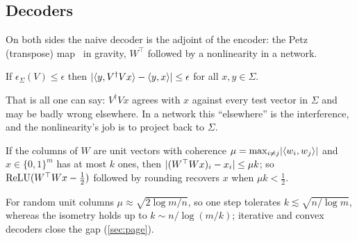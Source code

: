 \subsection{Decoders}
On both sides the naive decoder is the adjoint of the encoder: the Petz (transpose) map~\cite{Petz} in gravity,
$W^\top$ followed by a nonlinearity in a network.
\begin{lemma}\proved
If $\epsilon_\Sigma(V)\le\epsilon$ then $\lvert \langle y,V^\dagger Vx\rangle-\langle y,x\rangle\rvert\le\epsilon$ for all $x,y\in\Sigma$.
\end{lemma}
That is all one can say: $V^\dagger Vx$ agrees with $x$ against every test vector in $\Sigma$ and may be badly wrong
elsewhere. In a network this ``elsewhere'' is the interference, and the nonlinearity's job is to project back to
$\Sigma$.
\begin{proposition}\label{prop:onestep}\proved
If the columns of $W$ are unit vectors with coherence $\mu=\max_{i\ne j}\lvert \langle w_i,w_j\rangle\rvert$ and $x\in\{0,1\}^m$ has
at most $k$ ones, then $\lvert (W^\top Wx)_i-x_i\rvert\le\mu k$; so $\operatorname{ReLU}(W^\top Wx-\frac12)$ followed by rounding
recovers $x$ when $\mu k<\frac12$.
\end{proposition}
For random unit columns $\mu\approx\sqrt{2\log m/n}$, so one step tolerates $k\lesssim\sqrt{n/\log m}$, whereas the
isometry holds up to $k\sim n/\log(m/k)$; iterative and convex decoders close the gap (\cref{sec:page}).

